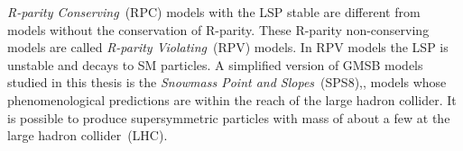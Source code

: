 {%
\textit{R-parity Conserving}~(RPC) models with the LSP stable are different from models  without the conservation of R-parity. These R-parity non-conserving models are called \textit{R-parity Violating}~(RPV) models. In RPV models the LSP is unstable and decays to SM particles. A simplified version of GMSB models studied in this thesis is the \textit{Snowmass Point and Slopes}~(SPS8),\cite{SPS8}, models whose phenomenological predictions are within the reach of the large hadron collider. It is possible to produce supersymmetric particles with mass of about a few \TeV at the large hadron collider~(LHC).
}

